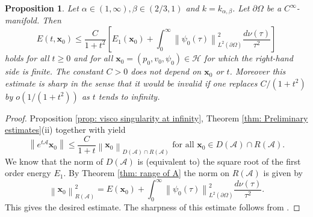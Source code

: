 \documentclass{amsart}
\newcommand{\norm}[1]{\left\| #1 \right\|}
\newcommand{\A}{\mathcal{A}}
\newcommand{\xnice}{\mathbf{x}}
\newcommand{\Ho}{\mathcal{H}}
\newtheorem{Proposition}[Theorem]{Proposition}
\begin{document}
  \begin{Proposition}
   Let $\alpha\in(1,\infty), \beta\in(2/3,1)$ and $k=k_{\alpha,\beta}$. Let $\partial\Omega$ be a $C^\infty$-manifold. Then
   \begin{equation}\nonumber
    E(t,\xnice_0) \leq \frac{C}{1+t^2} \left[ E_1(\xnice_0)
                                                   + \int_0^{\infty} \norm{\psi_0(\tau)}_{L^2(\partial\Omega)}^2 \frac{d\nu(\tau)}{\tau^2} \right]
   \end{equation}
   holds for all $t\geq0$ and for all $\xnice_0=(p_0,v_0,\psi_0)\in\Ho$ for which the right-hand side is finite. The constant $C>0$ does not depend on $\xnice_0$ or $t$. Moreover this estimate is sharp in the sense that it would be invalid if one replaces $C/(1+t^2)$ by $o(1/(1+t^2))$ as $t$ tends to infinity.
  \end{Proposition}
  
  \begin{proof}
   Proposition \ref{prop: visco singularity at infinity}, Theorem \ref{thm: Preliminary estimates}(ii) together with \cite[Theorem 8.4]{BattyChillTomilov2016} yield
   \begin{equation}\nonumber
    \norm{e^{t\A}\xnice_0} \leq \frac{C}{1+t} \norm{\xnice_0}_{D(\A) \cap R(\A)} \text{ for all } \xnice_0\in D(\A) \cap R(\A).
   \end{equation}
   We know that the norm of $D(\A)$ is (equivalent to) the square root of the first order energy $E_1$. By Theorem \ref{thm: range of A} the norm on $R(\A)$ is given by
   \begin{equation}\nonumber
    \norm{\xnice_0}_{R(\A)}^2 = E(\xnice_0) + \int_0^{\infty} \norm{\psi_0(\tau)}_{L^2(\partial\Omega)}^2 \frac{d\nu(\tau)}{\tau^2}.
   \end{equation}
   This gives the desired estimate. The sharpness of this estimate follows from \cite[Theorem 6.9 and the remarks in Chapter 8]{BattyChillTomilov2016}.
  \end{proof}

\end{document}
